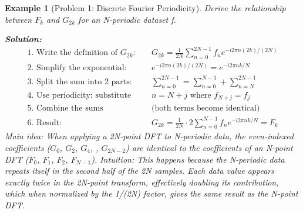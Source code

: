 \documentclass[11pt,a4paper]{article}
\newtheorem{example}[theorem]{Example}
\begin{document}
\begin{example}[Problem 1: Discrete Fourier Periodicity]
    Derive the relationship between $F_{k}$ and $G_{2k}$ for an N-periodic dataset f.
    
    \textbf{Solution:}
    \begin{align}
        \text{1. Write the definition of } G_{2k}: \quad & G_{2k} = \frac{1}{2N}\sum_{n=0}^{2N-1} f_n e^{-i2\pi n(2k)/(2N)} \\
        \text{2. Simplify the exponential: } & e^{-i2\pi n(2k)/(2N)} = e^{-i2\pi nk/N} \\
        \text{3. Split the sum into 2 parts: } & \sum_{n=0}^{2N-1} = \sum_{n=0}^{N-1} + \sum_{n=N}^{2N-1} \\
        \text{4. Use periodicity: substitute } & n = N + j \text{ where } f_{N+j} = f_j \\
        \text{5. Combine the sums} & \text{(both terms become identical)} \\
        \text{6. Result: } & G_{2k} = \frac{1}{2N} \cdot 2 \sum_{n=0}^{N-1} f_n e^{-i2\pi nk/N} = F_k
    \end{align}
    Main idea: When applying a 2N-point DFT to N-periodic data, the even-indexed coefficients ($G_0$, $G_2$, $G_4$, , $G_{2N-2}$) are identical to the coefficients of an N-point DFT ($F_0$, $F_1$, $F_2$, $F_{N-1}$).
    Intuition: This happens because the N-periodic data repeats itself in the second half of the 2N samples. Each data value appears exactly twice in the 2N-point transform, effectively doubling its contribution, which when normalized by the 1/(2N) factor, gives the same result as the N-point DFT.

\end{example}
\end{document}

